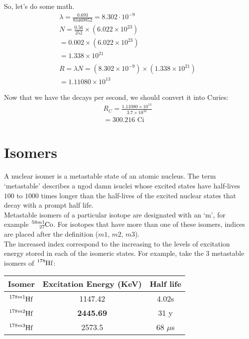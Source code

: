\documentclass{article}
\begin{document}
\begin{multicols*}{2}
    So, let's do some math.
    \begin{equation*}
      \begin{split}
        \lambda = \frac{0.693}{83469852} = 8.302 \cdot 10^{-9} \\
        N = \frac{0.56}{252} \times \left(6.022 \times 10^{23}\right) \\
          = 0.002 \times \left(6.022 \times 10^{23}\right) \\
          = 1.338\times 10^{21}\\
        \\
        R = \lambda{N} = (8.302 \times 10^{-9}) \times (1.338 \times 10^{21}) \\
        = \boxed{1.11080 \times 10^{13}}
      \end{split}
    \end{equation*}

    Now that we have the decays per second, we should convert it into Curies:
    \begin{equation*}
      \begin{split}
        R_C = \frac{1.11080 \times 10^{13}}{3.7\times{10^{10}}} \\
        = \boxed{300.216 \text{ Ci}}
      \end{split}
    \end{equation*}
    \section{Isomers}
    A nuclear isomer is a metastable state of an atomic nucleus. The term
    `metastable' describes a ngod damn isuclei whose excited states have half-lives $100$
    to $1000$ times longer than the half-lives of the excited nuclear states
    that decay with a prompt half life.\\

    Metastable isomers of a particular isotope are designated with an `m',
    for example $\ce{^{58m1}_{27}Co}$. For isotopes that have more than one
    of these isomers, indices are placed after the definition ($m1$, $m2$,
    $m3$).\\

    The increased index correspond to the increasing to the levels of excitation
    energy stored in each of the isomeric states. For example, take the $3$
    metastable isomers of $\ce{^{178}Hf}$:\\

    \begin{tabular}{|c|c|c|}
      \hline
      Isomer & Excitation Energy (KeV) & Half life \\
      \hline
      $\ce{^{178m1}Hf}$ & 1147.42 & 4.02s \\
      $\ce{^{178m2}Hf}$ & \textbf{2445.69} & 31 y \\
      $\ce{^{178m3}Hf}$ & 2573.5 & 68 $\mu$s \\
      \hline
    \end{tabular}


\end{multicols*}
\end{document}
